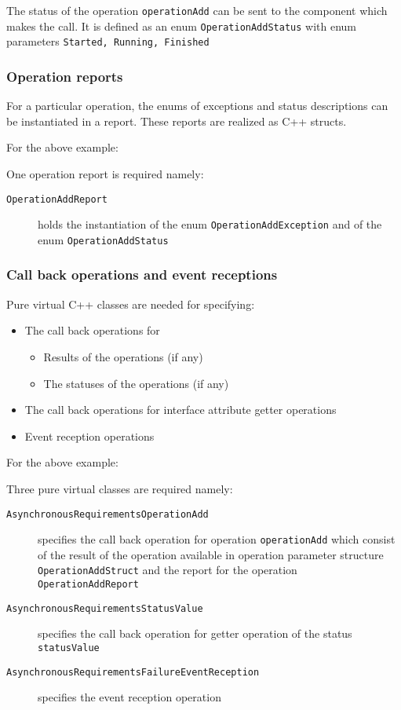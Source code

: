 The status of the operation \texttt{operationAdd} can be sent to the component which makes the call. It is defined as an enum \texttt{OperationAddStatus} with enum parameters \texttt{Started, Running, Finished}  

\subsubsection{Operation reports}
For a particular operation, the enums of exceptions and status descriptions can be instantiated in a report. These reports are realized as C++ structs.

For the above example:

One operation report is required namely:
\begin{description}
\item [\texttt{OperationAddReport}] holds the instantiation of the enum \texttt{OperationAddException} and of the enum \texttt{OperationAddStatus} 
\end{description}     

\subsubsection{Call back operations and event receptions}
Pure virtual C++ classes are needed for specifying:
\begin{itemize}
\item The call back operations for 
\begin{itemize}
\item Results of the operations (if any)
\item The statuses of the operations (if any)
\end{itemize}
\item The call back operations for interface attribute getter operations
\item Event reception operations
\end{itemize}

For the above example:

Three pure virtual classes are required namely:
\begin{description}
\item [\texttt{AsynchronousRequirementsOperationAdd}] specifies the call back operation for operation \texttt{operationAdd} which consist of the result of the operation available in operation parameter structure \texttt{OperationAddStruct} and the report for the operation \texttt{OperationAddReport}
\item [\texttt{AsynchronousRequirementsStatusValue}] specifies the call back operation for getter operation of the status \texttt{statusValue}
\item [\texttt{AsynchronousRequirementsFailureEventReception}] specifies the event reception operation 
\end{description}

